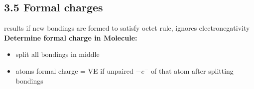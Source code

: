 \subsection{3.5 Formal charges}
    results if new bondings are formed to satisfy octet rule, ignores electronegativity\\
    \textbf{Determine formal charge in Molecule:}
    \begin{itemize}
        \itemsep0em
        \item split all bondings in middle
        \item atoms formal charge = VE if unpaired $- e^-$ of that atom after splitting bondings
    \end{itemize}
